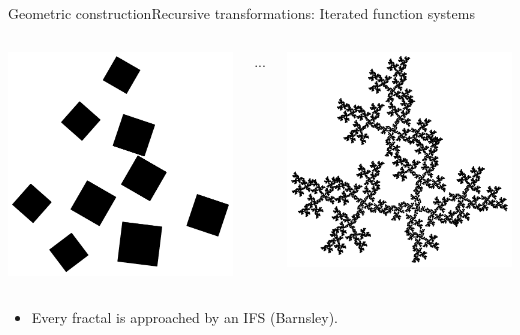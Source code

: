 \documentclass[xcolor=x11names,compress,professionalfonts]{beamer}
\renewcommand{\(}{\begin{columns}}
\renewcommand{\)}{\end{columns}}
\newcommand{\<}[1]{\begin{column}{#1}}
\renewcommand{\>}{\end{column}}
\begin{document}
\begin{frame}{Geometric construction}{Recursive transformations: Iterated function systems}
\begin{columns}
  \begin{column}{3cm}
    \includegraphics[scale=\s]{leaf2.pdf}
  \end{column}
  ...
    \begin{column}{3cm}
    \includegraphics[scale=\s]{leafInfty.pdf}
  \end{column}
\end{columns}

\begin{itemize}
	\item Every fractal is approached by an IFS (Barnsley).
\end{itemize}

\end{frame}
\end{document}
